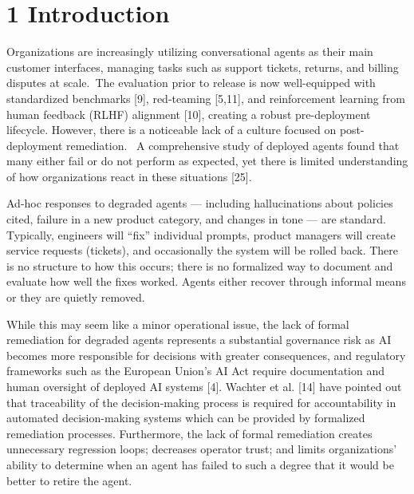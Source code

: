 \section{1  Introduction}

Organizations are increasingly utilizing conversational agents as their main customer interfaces, managing tasks such as support tickets, returns, and billing disputes at scale.~The evaluation prior to release is now well-equipped with standardized benchmarks [9], red-teaming [5,11], and reinforcement learning from human feedback (RLHF) alignment [10], creating a robust pre-deployment lifecycle. However, there is a noticeable lack of a culture focused on post-deployment remediation. ~A comprehensive study of deployed agents found that many either fail or do not perform as expected, yet there is limited understanding of how organizations react in these situations [25].

Ad-hoc responses to degraded agents --- including hallucinations about policies cited, failure in a new product category, and changes in tone --- are standard. Typically, engineers will ``fix'' individual prompts, product managers will create service requests (tickets), and occasionally the system will be rolled back. There is no structure to how this occurs; there is no formalized way to document and evaluate how well the fixes worked. Agents either recover through informal means or they are quietly removed.

While this may seem like a minor operational issue, the lack of formal remediation for degraded agents represents a substantial governance risk as AI becomes more responsible for decisions with greater consequences, and regulatory frameworks such as the European Union's AI Act require documentation and human oversight of deployed AI systems [4]. Wachter et al. [14] have pointed out that traceability of the decision-making process is required for accountability in automated decision-making systems which can be provided by formalized remediation processes. Furthermore, the lack of formal remediation creates unnecessary regression loops; decreases operator trust; and limits organizations' ability to determine when an agent has failed to such a degree that it would be better to retire the agent.

